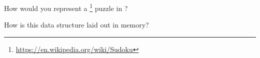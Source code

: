 How would you represent a \footnote{\url{https://en.wikipedia.org/wiki/Sudoku}} puzzle in \csharp?

How is this data structure laid out in memory?
